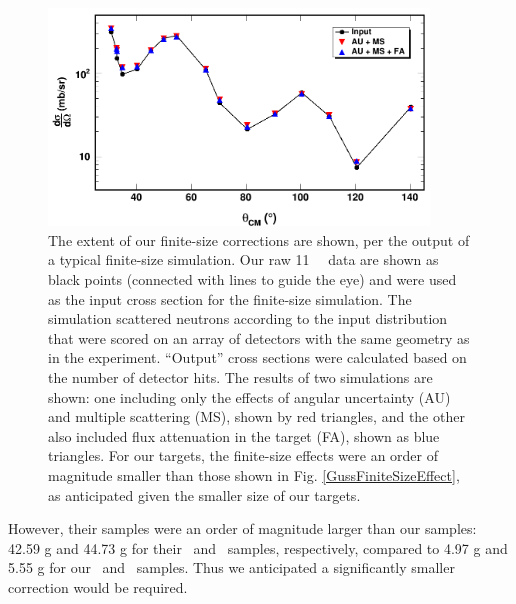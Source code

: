 \begin{figure}[tb]
    \centering
    \includegraphics[width=0.9\textwidth]{figures/finiteSizeCorrections.png}
    \caption[Effect of finite-size corrections on our neutron \el\ measurement]
    {
        The extent of our finite-size corrections are shown, per the output
        of a typical finite-size simulation. Our raw 11 \mega\electronvolt\ \snFour \el\ data
        are shown as black points (connected with lines to guide the eye) and
        were used as the input cross section for the finite-size simulation.
        The simulation scattered neutrons according to the input distribution
        that were scored on an array of detectors with the same geometry
        as in the experiment. ``Output'' cross sections were calculated based on
        the number of detector hits. The results of two simulations are shown:
        one including only the effects of
        angular uncertainty (AU) and multiple scattering (MS), shown by red
        triangles, and the other also included flux attenuation in the target
        (FA), shown as blue triangles. For our targets, the finite-size effects
        were an order of magnitude smaller
        than those shown in Fig. \ref{GussFiniteSizeEffect},
        as anticipated given the smaller size of our targets.
    }
    \label{finiteSizeCorrections}
\end{figure}
However, their samples
were an order of magnitude larger than our
samples: 42.59 g and 44.73 g for their \snSixteen\ and \snTwenty\ samples,
respectively, compared to 4.97 g and 5.55 g for our \snTwelve\ and \snFour\
samples. Thus we anticipated a significantly smaller correction would be
required.
